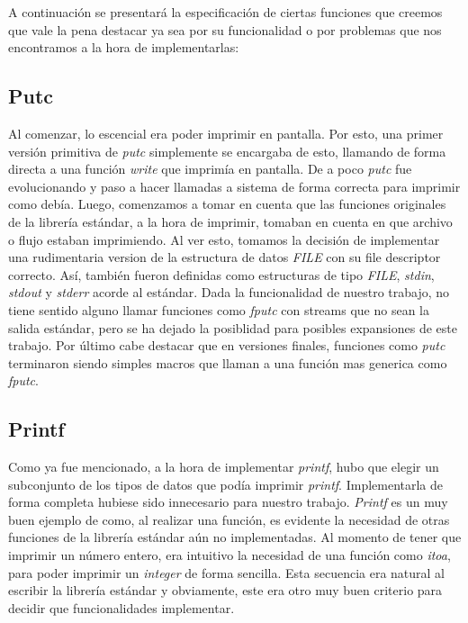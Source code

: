 \documentclass[a4paper,10pt]{article}
\begin{document}
    A continuación se presentará la especificación de ciertas funciones que creemos que vale la pena destacar ya sea por su funcionalidad o por problemas que nos encontramos a la hora de implementarlas:

    \subsection{Putc}
        Al comenzar, lo escencial era poder imprimir en pantalla. Por esto, una primer versión primitiva de \textit{putc} simplemente se encargaba de esto, llamando de forma directa a una función \textit{write} que imprimía en pantalla. De a poco \textit{putc} fue evolucionando y paso a hacer llamadas a sistema de forma correcta para imprimir como debía.
        Luego, comenzamos a tomar en cuenta que las funciones originales de la librería estándar, a la hora de imprimir, tomaban en cuenta en que archivo o flujo estaban imprimiendo. Al ver esto, tomamos la decisión de implementar una rudimentaria version de la estructura de datos \textit{FILE} con su file descriptor correcto. Así, también fueron definidas como estructuras de tipo \textit{FILE}, \textit{stdin}, \textit{stdout} y \textit{stderr} acorde al estándar. Dada la funcionalidad de nuestro trabajo, no tiene sentido alguno llamar funciones como \textit{fputc} con streams que no sean la salida estándar, pero se ha dejado la posiblidad para posibles expansiones de este trabajo.
        Por último cabe destacar que en versiones finales, funciones como \textit{putc} terminaron siendo simples macros que llaman a una función mas generica como \textit{fputc}.

    \subsection{Printf}
        Como ya fue mencionado, a la hora de implementar \textit{printf}, hubo que elegir un subconjunto de los tipos de datos que podía imprimir \textit{printf}. Implementarla de forma completa hubiese sido innecesario para nuestro trabajo. \textit{Printf} es un muy buen ejemplo de como, al realizar una función, es evidente la necesidad de otras funciones de la librería estándar aún no implementadas. Al momento de tener que imprimir un número entero, era intuitivo la necesidad de una función como \textit{itoa}, para poder imprimir un \textit{integer} de forma sencilla. Esta secuencia era natural al escribir la librería estándar y obviamente, este era otro muy buen criterio para decidir que funcionalidades implementar.
\end{document}
